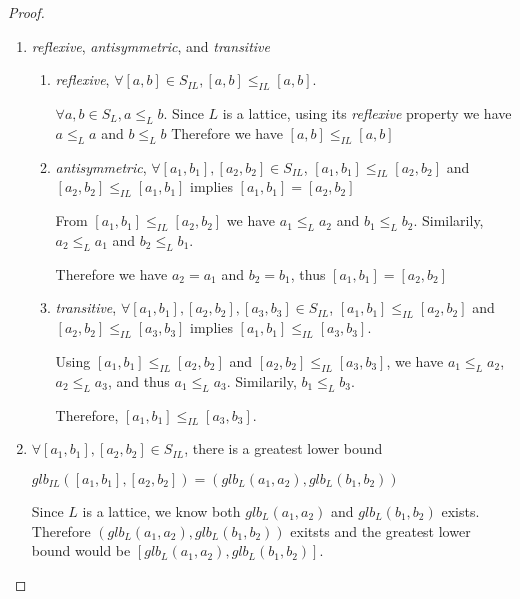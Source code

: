 \begin{proof}
    \begin{enumerate}
        \item \textit{reflexive}, \textit{antisymmetric}, and \textit{transitive}
        
        \begin{enumerate}
            \item \textit{reflexive}, $\forall [a, b] \in S_{IL}, [a, b] \le_{IL} [a, b]$.
            
            $\forall a, b \in S_L, a \le_L b$. 
            Since $L$ is a lattice, using its \textit{reflexive} property we have $a \le_L a$ and $b \le_L b$
            Therefore we have $[a, b] \le_{IL} [a, b]$

            \item \textit{antisymmetric},  $\forall [a_1, b_1], [a_2, b_2] \in S_{IL}$, $[a_1, b_1] \le_{IL} [a_2, b_2]$ and $[a_2, b_2] \le_{IL} [a_1, b_1]$ implies $[a_1, b_1] = [a_2, b_2]$
            
            From $[a_1, b_1] \le_{IL} [a_2, b_2]$ we have $a_1 \le_{L} a_2$ and $b_1 \le_{L} b_2$.
            Similarily, $a_2 \le_{L} a_1$ and $b_2 \le_{L} b_1$.
    
            Therefore we have  $a_2 = a_1$ and $b_2 = b_1$, thus $[a_1, b_1] = [a_2, b_2]$
            
            \item \textit{transitive}, $\forall [a_1, b_1], [a_2, b_2], [a_3, b_3] \in S_{IL}$, $[a_1, b_1] \le_{IL} [a_2, b_2]$ and $[a_2, b_2] \le_{IL} [a_3, b_3]$ implies $[a_1, b_1] \le_{IL} [a_3, b_3]$.
        
            Using  $[a_1, b_1] \le_{IL} [a_2, b_2]$ and $[a_2, b_2] \le_{IL} [a_3, b_3]$, we have $a_1 \le_L a_2$, $a_2 \le_L a_3$, and thus $a_1 \le_L a_3$. 
            Similarily, $b_1 \le_L b_3$.

            Therefore, $[a_1, b_1] \le_{IL} [a_3, b_3]$.
        \end{enumerate}

        \item $\forall [a_1, b_1], [a_2, b_2] \in S_{IL}$, there is a greatest lower bound
        
        $glb_{IL}([a_1, b_1], [a_2, b_2]) = (glb_L(a_1, a_2), glb_L(b_1, b_2))$

        Since $L$ is a lattice, we know both $glb_L(a_1, a_2)$ and $glb_L(b_1, b_2)$ exists. Therefore $(glb_L(a_1, a_2), glb_L(b_1, b_2))$ exitsts and the greatest lower bound would be $[glb_L(a_1, a_2), glb_L(b_1, b_2)]$.
        

\end{enumerate}
\end{proof}
